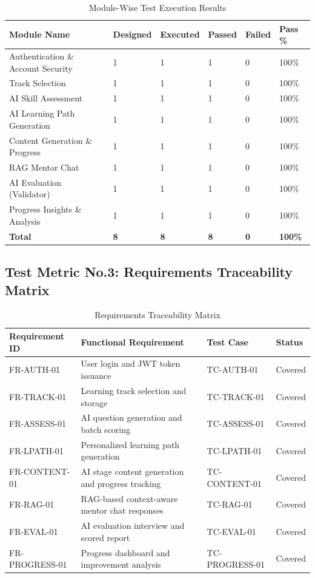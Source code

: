 \documentclass{FastFyp}
\begin{document}
\begin{table}[H]
\footnotesize
\centering
\caption{Module-Wise Test Execution Results}
\label{tab:metric02}
\begin{tabular}{|p{4.3cm}|p{1.5cm}|p{1.5cm}|p{1.5cm}|p{1.5cm}|p{1.5cm}|}
\hline
\textbf{Module Name} & \textbf{Designed} & \textbf{Executed} & \textbf{Passed} & \textbf{Failed} & \textbf{Pass \%} \\ \hline
Authentication \& Account Security & 1 & 1 & 1 & 0 & 100\% \\ \hline
Track Selection & 1 & 1 & 1 & 0 & 100\% \\ \hline
AI Skill Assessment & 1 & 1 & 1 & 0 & 100\% \\ \hline
AI Learning Path Generation & 1 & 1 & 1 & 0 & 100\% \\ \hline
Content Generation \& Progress & 1 & 1 & 1 & 0 & 100\% \\ \hline
RAG Mentor Chat & 1 & 1 & 1 & 0 & 100\% \\ \hline
AI Evaluation (Validator) & 1 & 1 & 1 & 0 & 100\% \\ \hline
Progress Insights \& Analysis & 1 & 1 & 1 & 0 & 100\% \\ \hline
\textbf{Total} & \textbf{8} & \textbf{8} & \textbf{8} & \textbf{0} & \textbf{100\%} \\ \hline
\end{tabular}
\end{table}

\subsection{Test Metric No.3: Requirements Traceability Matrix}

\begin{table}[H]
\footnotesize
\centering
\caption{Requirements Traceability Matrix}
\label{tab:metric03}
\begin{tabular}{|p{2.8cm}|p{5cm}|p{2.3cm}|p{2.5cm}|}
\hline
\textbf{Requirement ID} & \textbf{Functional Requirement} & \textbf{Test Case} & \textbf{Status} \\ \hline
FR-AUTH-01 & User login and JWT token issuance & TC-AUTH-01 & Covered \\ \hline
FR-TRACK-01 & Learning track selection and storage & TC-TRACK-01 & Covered \\ \hline
FR-ASSESS-01 & AI question generation and batch scoring & TC-ASSESS-01 & Covered \\ \hline
FR-LPATH-01 & Personalized learning path generation & TC-LPATH-01 & Covered \\ \hline
FR-CONTENT-01 & AI stage content generation and progress tracking & TC-CONTENT-01 & Covered \\ \hline
FR-RAG-01 & RAG-based context-aware mentor chat responses & TC-RAG-01 & Covered \\ \hline
FR-EVAL-01 & AI evaluation interview and scored report & TC-EVAL-01 & Covered \\ \hline
FR-PROGRESS-01 & Progress dashboard and improvement analysis & TC-PROGRESS-01 & Covered \\ \hline
\end{tabular}
\end{table}
\end{document}
